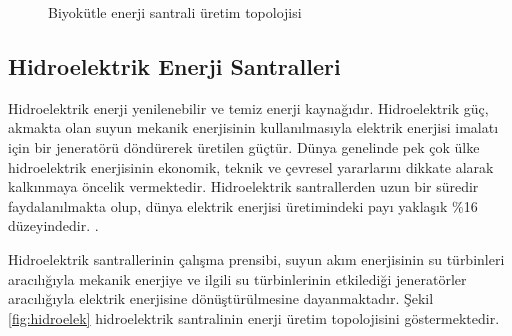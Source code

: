 \begin{figure}[htbp]


\caption{Biyokütle enerji santrali üretim topolojisi}
\label{fig:biomass}
\end{figure}




\subsection{Hidroelektrik Enerji Santralleri}



Hidroelektrik enerji yenilenebilir ve temiz enerji kaynağıdır. Hidroelektrik güç,
akmakta olan suyun mekanik enerjisinin kullanılmasıyla elektrik enerjisi imalatı için bir jeneratörü döndürerek üretilen güçtür. Dünya genelinde pek çok ülke hidroelektrik enerjisinin ekonomik, teknik ve çevresel yararlarını dikkate alarak kalkınmaya öncelik vermektedir. Hidroelektrik santrallerden uzun bir süredir faydalanılmakta olup, dünya elektrik enerjisi üretimindeki payı yaklaşık \%16 düzeyindedir. \cite{speight2022encyclopedia}.


Hidroelektrik santrallerinin çalışma prensibi, suyun akım enerjisinin su türbinleri aracılığıyla mekanik enerjiye ve ilgili su türbinlerinin etkilediği jeneratörler aracılığıyla elektrik enerjisine dönüştürülmesine dayanmaktadır. Şekil \ref{fig:hidroelek} hidroelektrik santralinin enerji üretim topolojisini göstermektedir.
 
